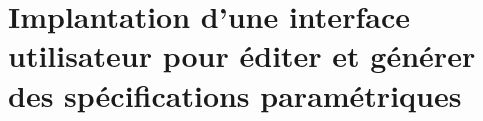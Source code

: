 
\section[Implantation d'une interface utilisateur pour éditer et générer des spécifications paramétriques]{Implantation d'une interface utilisateur pour éditer et générer des spécifications paramétriques}
\label{sec:implantation-interface-utilisateur}

